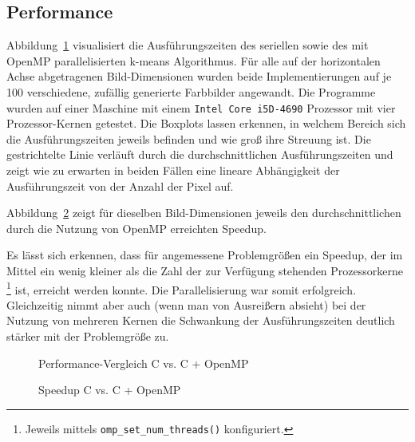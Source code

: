 \documentclass[
    bibliography=totoc, cd=lightcolor, cdmath=false, ngerman]{tudscrreprt}
\begin{document}
\inputminted[firstline=165, label=kmeansomp, highlightlines={
174, 180-181, 191-192, 204, 209-212, 241, 248-249, 254, 263-266, 268-271, 281,
284-286, 288}]{C}{c/src/kmeans.c}

\subsection{Performance}

Abbildung~\ref{img:copenmpboxplot} visualisiert die Ausführungszeiten des
seriellen sowie des mit OpenMP parallelisierten k-means Algorithmus. Für alle
auf der horizontalen Achse abgetragenen Bild-Dimensionen wurden beide
Implementierungen auf je 100 verschiedene, zufällig generierte Farbbilder
angewandt. Die Programme wurden auf einer Maschine mit einem \texttt{Intel Core
i5D-4690} Prozessor mit vier Prozessor-Kernen getestet. Die Boxplots lassen
erkennen, in welchem Bereich sich die Ausführungszeiten jeweils befinden und
wie groß ihre Streuung ist. Die gestrichtelte Linie verläuft durch die
durchschnittlichen Ausführungszeiten und zeigt wie zu erwarten in beiden Fällen
eine lineare Abhängigkeit der Ausführungszeit von der Anzahl der Pixel auf.

Abbildung~\ref{img:copenmpspeedup} zeigt für dieselben Bild-Dimensionen jeweils
den durchschnittlichen durch die Nutzung von OpenMP erreichten Speedup.

Es lässt sich erkennen, dass für angemessene Problemgrößen ein Speedup, der im
Mittel ein wenig kleiner als die Zahl der zur Verfügung stehenden Prozessorkerne
\footnote{Jeweils mittels \texttt{omp\_set\_num\_threads()} konfiguriert.} ist,
erreicht werden konnte. Die Parallelisierung war somit erfolgreich.
Gleichzeitig nimmt aber auch (wenn man von Ausreißern absieht) bei der Nutzung
von mehreren Kernen die Schwankung der Ausführungszeiten deutlich stärker mit
der Problemgröße zu.

\begin{figure}[h]
\centering

\caption{Performance-Vergleich C vs. C + OpenMP}
\label{img:copenmpboxplot}
\end{figure}

\begin{figure}[h]
\centering

\caption{Speedup C vs. C + OpenMP}
\label{img:copenmpspeedup}
\end{figure}
\end{document}
